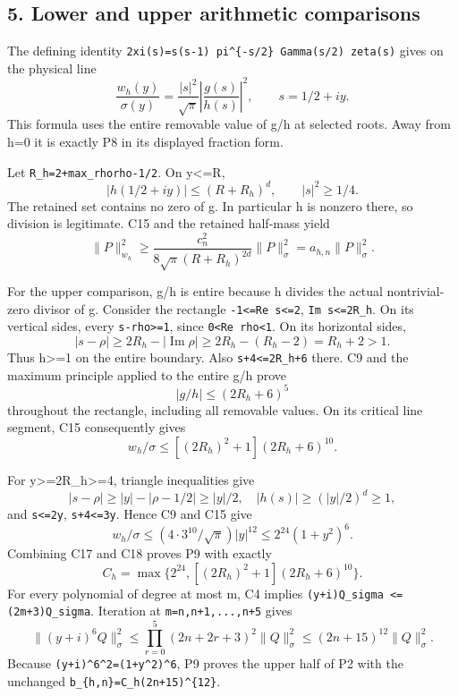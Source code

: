 \documentclass[11pt]{article}
\begin{document}
\subsection{5. Lower and upper arithmetic comparisons}\label{mrcoerc:lower-and-upper-arithmetic-comparisons}

The defining identity \texttt{2xi(s)=s(s-1)\ pi\^{}\{-s/2\}\ Gamma(s/2)\ zeta(s)} gives on the physical line \[
\frac{w_h(y)}{\sigma(y)}=
 \frac{|s|^2}{\sqrt\pi}\left|\frac{g(s)}{h(s)}\right|^2,
 \qquad s=1/2+iy.
\tag{C15}
\] This formula uses the entire removable value of g/h at selected roots. Away from h=0 it is exactly P8 in its displayed fraction form.

Let \texttt{R\_h=2+max\_rho\textbar{}rho-1/2\textbar{}}. On \textbar y\textbar\textless=R, \[
|h(1/2+iy)|\le(R+R_h)^d,\qquad |s|^2\ge1/4.
\] The retained set contains no zero of g. In particular h is nonzero there, so division is legitimate. C15 and the retained half-mass yield \[
\|P\|_{w_h}^2\ge
\frac{c_n^2}{8\sqrt\pi(R+R_h)^{2d}}\|P\|_\sigma^2
=a_{h,n}\|P\|_\sigma^2.
\tag{C16}
\]

For the upper comparison, g/h is entire because h divides the actual nontrivial-zero divisor of g. Consider the rectangle \texttt{-1\textless{}=Re\ s\textless{}=2}, \texttt{\textbar{}Im\ s\textbar{}\textless{}=2R\_h}. On its vertical sides, every \texttt{\textbar{}s-rho\textbar{}\textgreater{}=1}, since \texttt{0\textless{}Re\ rho\textless{}1}. On its horizontal sides, \[
|s-\rho|\ge2R_h-|\operatorname{Im}\rho|
 \ge2R_h-(R_h-2)=R_h+2>1.
\] Thus \textbar h\textbar\textgreater=1 on the entire boundary. Also \texttt{\textbar{}s\textbar{}+4\textless{}=2R\_h+6} there. C9 and the maximum principle applied to the entire g/h prove \[
|g/h|\le(2R_h+6)^5
\] throughout the rectangle, including all removable values. On its critical line segment, C15 consequently gives \[
w_h/\sigma\le[(2R_h)^2+1](2R_h+6)^{10}.
\tag{C17}
\]

For \textbar y\textbar\textgreater=2R\_h\textgreater=4, triangle inequalities give \[
|s-\rho|\ge|y|-|\rho-1/2|\ge|y|/2,\quad
|h(s)|\ge(|y|/2)^d\ge1,
\] and \texttt{\textbar{}s\textbar{}\textless{}=2\textbar{}y\textbar{}}, \texttt{\textbar{}s\textbar{}+4\textless{}=3\textbar{}y\textbar{}}. Hence C9 and C15 give \[
w_h/\sigma\le(4\cdot3^{10}/\sqrt\pi)|y|^{12}
 \le2^{24}(1+y^2)^6.
\tag{C18}
\] Combining C17 and C18 proves P9 with exactly \[
C_h=\max\{2^{24},[(2R_h)^2+1](2R_h+6)^{10}\}.
\] For every polynomial of degree at most m, C4 implies \texttt{\textbar{}\textbar{}(y+i)Q\textbar{}\textbar{}\_sigma\ \textless{}=(2m+3)\textbar{}\textbar{}Q\textbar{}\textbar{}\_sigma}. Iteration at \texttt{m=n,n+1,...,n+5} gives \[
\|(y+i)^6Q\|_\sigma^2\le
 \prod_{r=0}^5(2n+2r+3)^2\|Q\|_\sigma^2
 \le(2n+15)^{12}\|Q\|_\sigma^2.
\] Because \texttt{\textbar{}(y+i)\^{}6\textbar{}\^{}2=(1+y\^{}2)\^{}6}, P9 proves the upper half of P2 with the unchanged \texttt{b\_\{h,n\}=C\_h(2n+15)\^{}\{12\}}.
\end{document}
